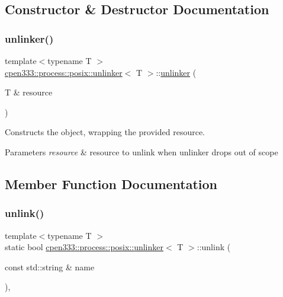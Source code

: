 \subsection{Constructor \& Destructor Documentation}
\mbox{\label{classcpen333_1_1process_1_1posix_1_1unlinker_a3a917c13138940b905f5ee4c70447748}} 
\subsubsection{\texorpdfstring{unlinker()}{unlinker()}}
{\footnotesize\ttfamily template$<$typename T $>$ \\
\hyperlink{classcpen333_1_1process_1_1posix_1_1unlinker}{cpen333\+::process\+::posix\+::unlinker}$<$ T $>$\+::\hyperlink{classcpen333_1_1process_1_1posix_1_1unlinker}{unlinker} (\begin{DoxyParamCaption}\item[{T \&}]{resource }\end{DoxyParamCaption})\hspace{0.3cm}{\ttfamily [inline]}}



Constructs the object, wrapping the provided resource. 


\begin{DoxyParams}{Parameters}
{\em resource} & resource to unlink when unlinker drops out of scope \\
\hline
\end{DoxyParams}


\subsection{Member Function Documentation}
\mbox{\label{classcpen333_1_1process_1_1posix_1_1unlinker_af105f80e5698e59b5c3994ff228ed6c9}} 
\subsubsection{\texorpdfstring{unlink()}{unlink()}}
{\footnotesize\ttfamily template$<$typename T $>$ \\
static bool \hyperlink{classcpen333_1_1process_1_1posix_1_1unlinker}{cpen333\+::process\+::posix\+::unlinker}$<$ T $>$\+::unlink (\begin{DoxyParamCaption}\item[{const std\+::string \&}]{name }\end{DoxyParamCaption})\hspace{0.3cm}{\ttfamily [inline]}, {\ttfamily [static]}}



